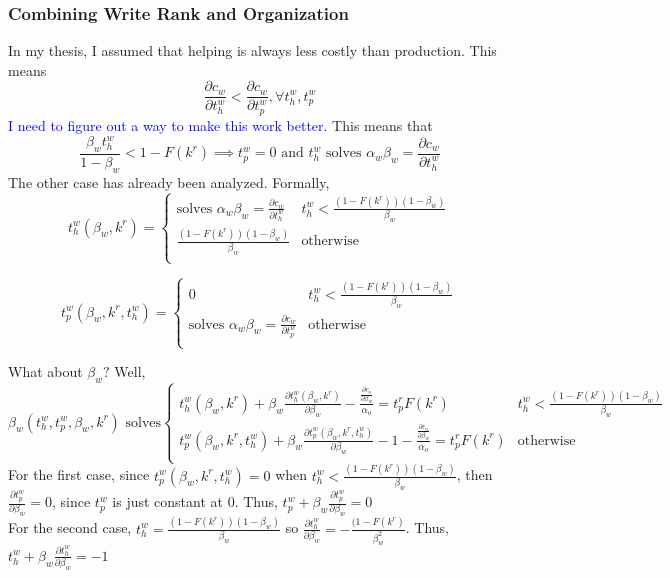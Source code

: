 \documentclass[12pt,notitlepage]{article}
\begin{document}
\subsubsection{Combining Write Rank and Organization}
In my thesis, I assumed that helping is always less costly than production. This means $$\frac{\partial c_w}{\partial t_h^w} < \frac{\partial c_w}{\partial t_p^w}, \forall t_h^w, t_p^w$$
\textcolor{blue}{I need to figure out a way to make this work better}. This means that 
$$\frac{\beta_w t_h^w}{1-\beta_w} < 1-F(k^r) \implies t_p^w = 0 \text{ and } t_h^w \text{ solves } \alpha_w \beta_w = \frac{\partial c_w}{\partial t_h^w}$$
The other case has already been analyzed. 
Formally, \\
$$t_h^w(\beta_w, k^r) =  
\begin{cases} 
    \text{solves } \alpha_w\beta_w = \frac{\partial c_w}{\partial t_h^w} & t_h^w < \frac{(1-F(k^r))(1-\beta_w)}{\beta_w} \\
    \frac{(1-F(k^r))(1-\beta_w)}{\beta_w} & \text{otherwise } \\
\end{cases}$$

$$t_p^w(\beta_w, k^r, t_h^w) =  
\begin{cases} 
    0 & t_h^w < \frac{(1-F(k^r))(1-\beta_w)}{\beta_w} \\
    \text{solves }\alpha_w \beta_w = \frac{\partial c_w}{\partial t_p^w} & \text{otherwise } \\
\end{cases}$$


What about $\beta_w?$ Well, 
$$\beta_w(t_h^w, t_p^w, \beta_w, k^r) \text{ solves}  
\begin{cases} 
    t_h^w(\beta_w, k^r) + \beta_w\frac{\partial t_h^w(\beta_w, k^r)}{\partial \beta_w} -\frac{\frac{\partial c_o}{\partial \beta_w}}{\alpha_o} = t_p^rF(k^r) & t_h^w < \frac{(1-F(k^r))(1-\beta_w)}{\beta_w} \\
    t_p^w(\beta_w, k^r, t_h^w)  + \beta_w \frac{\partial t_p^w(\beta_w, k^r, t_h^w)}{\partial \beta_w} - 1 - \frac{\frac{\partial c_o}{\partial \beta_w}}{\alpha_o} = t_p^rF(k^r) & \text{otherwise } \\
\end{cases}$$
For the first case, since $t_p^w(\beta_w, k^r, t_h^w) = 0$ when $t_h^w < \frac{(1-F(k^r))(1-\beta_w)}{\beta_w}$, then $\frac{\partial t_p^w}{\partial \beta_w} = 0$, since $t_p^w$ is just constant at 0. Thus, $t_p^w + \beta_w\frac{\partial t_p^w}{\partial \beta_w} = 0$\\
For the second case, $t_h^w = \frac{(1-F(k^r))(1-\beta_w)}{\beta_w}$ so $\frac{\partial t_h^w}{\partial \beta_w} = -\frac{(1-F(k^r)}{\beta_w^2}$. Thus, $t_h^w + \beta_w\frac{\partial t_h^w}{\partial \beta_w} = -1$
\end{document}
